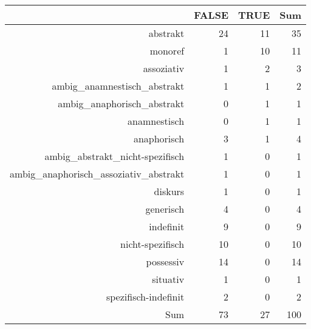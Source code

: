 \begin{tabular}{rrrr}
  \hline
 & FALSE & TRUE & Sum \\ 
  \hline
abstrakt & 24 & 11 & 35 \\ 
  monoref & 1 & 10 & 11 \\ 
  assoziativ & 1 & 2 & 3 \\ 
  ambig\_anamnestisch\_abstrakt & 1 & 1 & 2 \\ 
  ambig\_anaphorisch\_abstrakt & 0 & 1 & 1 \\ 
  anamnestisch & 0 & 1 & 1 \\ 
  anaphorisch & 3 & 1 & 4 \\ 
  ambig\_abstrakt\_nicht-spezifisch & 1 & 0 & 1 \\ 
  ambig\_anaphorisch\_assoziativ\_abstrakt & 1 & 0 & 1 \\ 
  diskurs & 1 & 0 & 1 \\ 
  generisch & 4 & 0 & 4 \\ 
  indefinit & 9 & 0 & 9 \\ 
  nicht-spezifisch & 10 & 0 & 10 \\ 
  possessiv & 14 & 0 & 14 \\ 
  situativ & 1 & 0 & 1 \\ 
  spezifisch-indefinit & 2 & 0 & 2 \\ 
  Sum & 73 & 27 & 100 \\ 
   \hline
\end{tabular}
